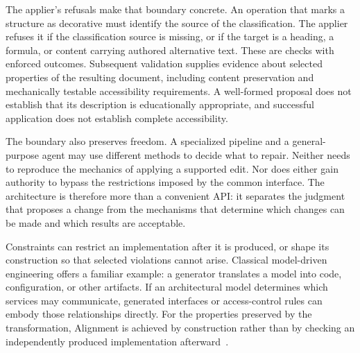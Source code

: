 The applier's refusals make that boundary concrete. An operation that marks a structure as decorative must identify the source of the classification. The applier refuses it if the classification source is missing, or if the target is a heading, a formula, or content carrying authored alternative text. These are checks with enforced outcomes. Subsequent validation supplies evidence about selected properties of the resulting document, including content preservation and mechanically testable accessibility requirements. A well-formed proposal does not establish that its description is educationally appropriate, and successful application does not establish complete accessibility.

The boundary also preserves freedom. A specialized pipeline and a general-purpose agent may use different methods to decide what to repair. Neither needs to reproduce the mechanics of applying a supported edit. Nor does either gain authority to bypass the restrictions imposed by the common interface. The architecture is therefore more than a convenient API: it separates the judgment that proposes a change from the mechanisms that determine which changes can be made and which results are acceptable.


Constraints can restrict an implementation after it is produced, or shape its construction so that selected violations cannot arise. Classical model-driven engineering offers a familiar example: a generator translates a model into code, configuration, or other artifacts. If an architectural model determines which services may communicate, generated interfaces or access-control rules can embody those relationships directly. For the properties preserved by the transformation, Alignment is achieved by construction rather than by checking an independently produced implementation afterward~\citep{schmidt2006model,sendall2003model,czarnecki2006feature}.

